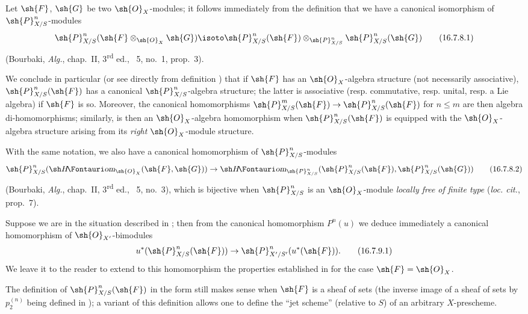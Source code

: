 
\begin{env}[16.7.8]
\label{IV.16.7.8}
Let $\sh{F}$, $\sh{G}$ be two $\sh{O}_X$-modules;
it follows immediately from the definition  that we have a canonical isomorphism of $\sh{P}_{X/S}^n$-modules
\[
  \label{IV.16.7.8.1}
  \sh{P}_{X/S}^n(\sh{F} \otimes_{\sh{O}_X} \sh{G}) \isoto \sh{P}_{X/S}^n(\sh{F}) \otimes_{\sh{P}_{X/S}^n} \sh{P}_{X/S}^n(\sh{G})
  \tag{16.7.8.1}
\]
(Bourbaki, \emph{Alg.}, chap.~II, 3\textsuperscript{rd} ed., \textsection~5, no.~1, prop.~3).

We conclude in particular (or see directly from definition ) that if $\sh{F}$ has an $\sh{O}_X$-algebra structure (not necessarily associative), $\sh{P}_{X/S}^n(\sh{F})$ has a canonical $\sh{P}_{X/S}^n$-algebra structure;
the latter is associative (resp. commutative, resp. unital, resp. a Lie algebra) if $\sh{F}$ is so.
Moreover, the canonical homomorphisms $\sh{P}_{X/S}^m(\sh{F}) \to \sh{P}_{X/S}^n(\sh{F})$ for $n \leq m$  are then algebra di-homomorphisms;
similarly,  is then an $\sh{O}_X$-algebra homomorphism when $\sh{P}_{X/S}^n(\sh{F})$ is equipped with the $\sh{O}_X$-algebra structure arising from its \emph{right} $\sh{O}_X$-module structure.

With the same notation, we also have a canonical homomorphism of $\sh{P}_{X/S}^n$-modules
\[
  \label{IV.16.7.8.2}
  \sh{P}_{X/S}^n(\shHom_{\sh{O}_X}(\sh{F}, \sh{G})) \to \shHom_{\sh{P}_{X/S}^n}(\sh{P}_{X/S}^n(\sh{F}), \sh{P}_{X/S}^n(\sh{G}))
  \tag{16.7.8.2}
\]
(Bourbaki, \emph{Alg.}, chap.~II, 3\textsuperscript{rd} ed., \textsection~5, no.~3), which is bijective when $\sh{P}_{X/S}^n$ is an $\sh{O}_X$-module \emph{locally free of finite type} (\emph{loc. cit.}, prop.~7).
\end{env}

\begin{env}[16.7.9]
\label{IV.16.7.9}
Suppose we are in the situation described in ;
then from the canonical homomorphism $P^n(u)$  we deduce immediately a canonical homomorphism of $\sh{O}_{X'}$-bimodules 
\[
  \label{IV.16.7.9.1}
  u^*(\sh{P}_{X/S}^n(\sh{F})) \to \sh{P}_{X'/S'}^n(u^*(\sh{F})).
  \tag{16.7.9.1}
\]
We leave it to the reader to extend to this homomorphism the properties established in  for the case $\sh{F} = \sh{O}_X$.
\end{env}

\begin{remark}[16.7.10]
\label{IV.16.7.10}
The definition of $\sh{P}_{X/S}^n(\sh{F})$ in the form  still makes sense when $\sh{F}$ is a sheaf of sets (the inverse image of a sheaf of sets by $p_2^{(n)}$ being defined in );
a variant of this definition allows one to define the ``jet scheme'' (relative to $S$) of an arbitrary $X$-prescheme.
\end{remark}


